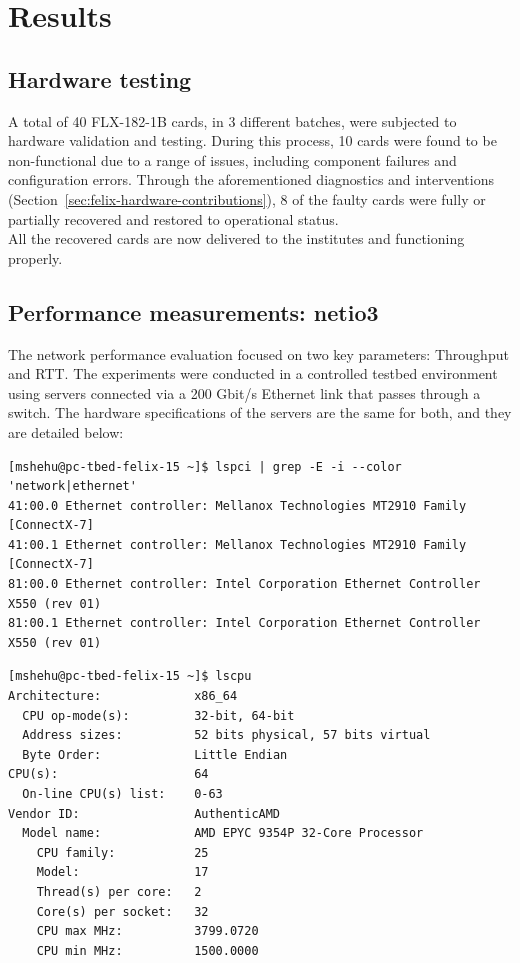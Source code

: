 \chapter{Results}

\section{Hardware testing}

A total of 40 FLX-182-1B cards, in 3 different batches, were subjected to hardware validation and testing. During this process, 10 cards were found to be non-functional due to a range of issues, including component failures and configuration errors. Through the aforementioned diagnostics and interventions (Section~\ref{sec:felix-hardware-contributions}), 8 of the faulty cards were fully or partially recovered and restored to operational status.\\
All the recovered cards are now delivered to the institutes and functioning properly.

\section{Performance measurements: netio3}
\label{sec:netio3-perf}
The network performance evaluation focused on two key parameters: Throughput and \ac{RTT}. The experiments were conducted in a controlled testbed environment using servers connected via a 200 Gbit/s Ethernet link that passes through a switch. The hardware specifications of the servers are the same for both, and they are detailed below:


\begin{lstlisting}[caption={Network interface information}, label={lst:network}]
[mshehu@pc-tbed-felix-15 ~]$ lspci | grep -E -i --color 'network|ethernet'
41:00.0 Ethernet controller: Mellanox Technologies MT2910 Family [ConnectX-7]
41:00.1 Ethernet controller: Mellanox Technologies MT2910 Family [ConnectX-7]
81:00.0 Ethernet controller: Intel Corporation Ethernet Controller X550 (rev 01)
81:00.1 Ethernet controller: Intel Corporation Ethernet Controller X550 (rev 01)
\end{lstlisting}

\begin{lstlisting}[caption={CPU information}, label={lst:cpu}, float=htbp]
[mshehu@pc-tbed-felix-15 ~]$ lscpu
Architecture:             x86_64
  CPU op-mode(s):         32-bit, 64-bit
  Address sizes:          52 bits physical, 57 bits virtual
  Byte Order:             Little Endian
CPU(s):                   64
  On-line CPU(s) list:    0-63
Vendor ID:                AuthenticAMD
  Model name:             AMD EPYC 9354P 32-Core Processor
    CPU family:           25
    Model:                17
    Thread(s) per core:   2
    Core(s) per socket:   32
    CPU max MHz:          3799.0720
    CPU min MHz:          1500.0000
\end{lstlisting}

